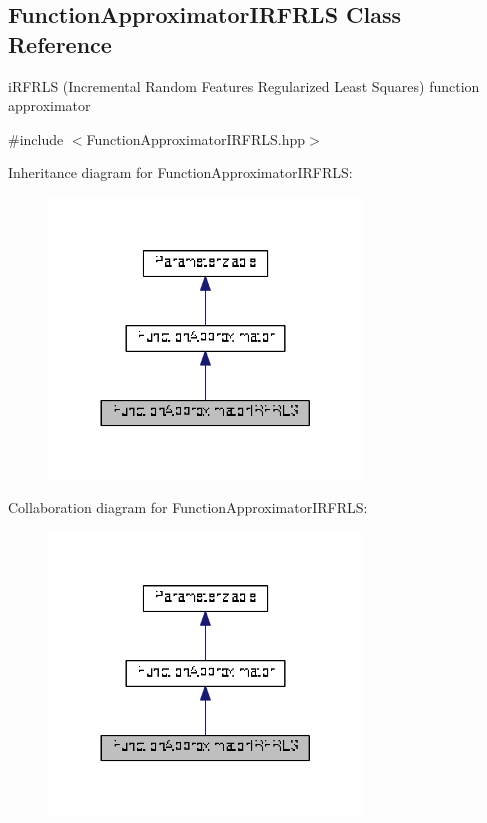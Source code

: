 \hypertarget{classDmpBbo_1_1FunctionApproximatorIRFRLS}{\subsection{Function\+Approximator\+I\+R\+F\+R\+L\+S Class Reference}
\label{classDmpBbo_1_1FunctionApproximatorIRFRLS}
}


i\+R\+F\+R\+L\+S (Incremental Random Features Regularized Least Squares) function approximator  




{\ttfamily \#include $<$Function\+Approximator\+I\+R\+F\+R\+L\+S.\+hpp$>$}



Inheritance diagram for Function\+Approximator\+I\+R\+F\+R\+L\+S\+:
\nopagebreak
\begin{figure}[H]
\begin{center}
\leavevmode
\includegraphics[width=236pt]{classDmpBbo_1_1FunctionApproximatorIRFRLS__inherit__graph}
\end{center}
\end{figure}


Collaboration diagram for Function\+Approximator\+I\+R\+F\+R\+L\+S\+:
\nopagebreak
\begin{figure}[H]
\begin{center}
\leavevmode
\includegraphics[width=236pt]{classDmpBbo_1_1FunctionApproximatorIRFRLS__coll__graph}
\end{center}
\end{figure}
